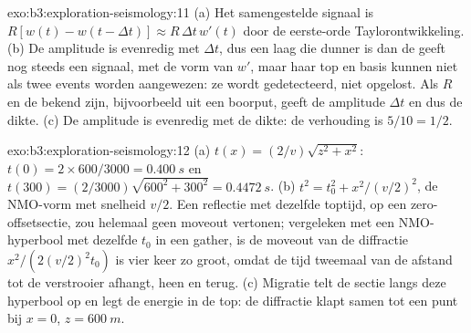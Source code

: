 \begin{solution}{exo:b3:exploration-seismology:11}
(a) Het samengestelde signaal is $R[w(t) - w(t - \Delta t)] \approx R\,\Delta t\,w'(t)$ door
de eerste-orde Taylorontwikkeling. (b) De amplitude is evenredig met
$\Delta t$, dus een laag die dunner is dan de  geeft nog steeds een signaal,
met de vorm van $w'$, maar haar top en basis kunnen niet als twee events worden aangewezen: ze
wordt gedetecteerd, niet opgelost. Als $R$ en de  bekend zijn, bijvoorbeeld uit een
boorput, geeft de amplitude $\Delta t$ en dus de dikte. (c) De amplitude is
evenredig met de dikte: de verhouding is $5/10 = 1/2$.
\end{solution}

\begin{solution}{exo:b3:exploration-seismology:12}
(a) $t(x) = (2/v)\sqrt{z^2 + x^2}$: $t(0) = 2\times600/3000 = \qty{0.400}{s}$ en
$t(300) = (2/3000)\sqrt{600^2 + 300^2} = \qty{0.4472}{s}$. (b) $t^2 = t_0^2 +
x^2/(v/2)^2$, de NMO-vorm met snelheid $v/2$. Een reflectie met dezelfde
toptijd, op een zero-offsetsectie, zou helemaal geen moveout vertonen; vergeleken met een
NMO-hyperbool met dezelfde $t_0$ in een gather, is de moveout van de diffractie
$x^2/(2(v/2)^2t_0)$ is vier keer zo groot, omdat de tijd tweemaal van de afstand
tot de verstrooier afhangt, heen en terug. (c) Migratie telt de
sectie langs deze hyperbool op en legt de energie in de top: de diffractie
klapt samen tot een punt bij $x = 0$, $z = \qty{600}{m}$.
\end{solution}

